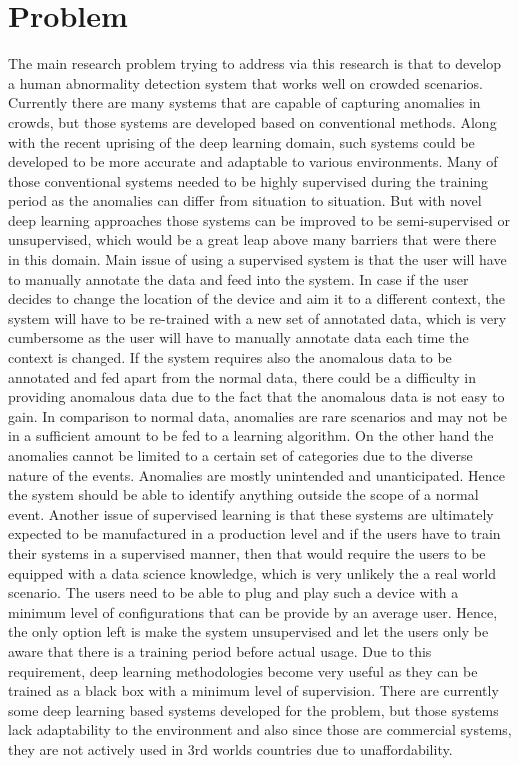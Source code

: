 \documentclass[a4paper,12pt]{report}
\begin{document}
\section{Problem}

The main research problem trying to address via this research is that to develop a human abnormality detection system that works well on crowded scenarios. Currently there are many systems that are capable of capturing anomalies in crowds, but those systems are developed based on conventional methods. Along with the recent uprising of the deep learning domain, such systems could be developed to be more accurate and adaptable to various environments. Many of those conventional systems needed to be highly supervised during the training period as the anomalies can differ from situation to situation. But with novel deep learning approaches those systems can be improved to be semi-supervised or unsupervised, which would be a great leap above many barriers that were there in this domain. Main issue of using a supervised system is that the user will have to manually annotate the data and feed into the system. In case if the user decides to change the location of the device and aim it to a different context, the system will have to be re-trained with a new set of annotated data, which is very cumbersome as the user will have to manually annotate data each time the context is changed. If the system requires also  the anomalous data to be annotated and fed apart from the normal data, there could be a difficulty in providing anomalous data due to the fact that the anomalous data is not easy to gain. In comparison to normal data, anomalies are rare scenarios and may not be in a sufficient amount to be fed to a learning algorithm. On the other hand the anomalies cannot be limited to a certain set of categories due to the diverse nature of the events. Anomalies are mostly unintended and unanticipated. Hence the system should be able to identify anything outside the scope of a normal event. Another issue of supervised learning is that these systems are ultimately expected to be manufactured in a production level and if the users have to train their systems in a supervised manner, then that would require the users to be equipped with a data science knowledge, which is very unlikely the a real world scenario. The users need to be able to plug and play such a device with a minimum level of configurations that can be provide by an average user. Hence, the only option left is make the system unsupervised and let the users only be aware that there is a training period before actual usage. Due to this requirement, deep learning methodologies become very useful as they can be trained as a black box with a minimum level of supervision. There are currently some deep learning based systems developed for the problem, but those systems lack adaptability to the environment and also since those are commercial systems, they are not actively used in 3rd worlds countries due to unaffordability. 
\end{document}
